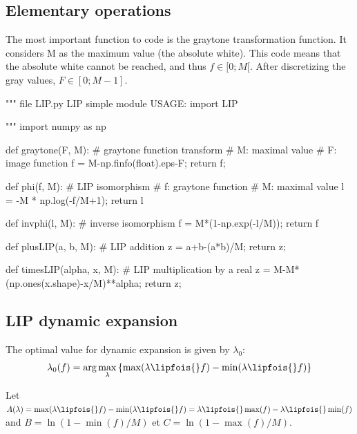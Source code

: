\def\QRCODE{MASTER_mispa_TUT.IMG.lip_pythonqrcode.png}
\def\QRPAGE{http://www.iptutorials.science/tree/master/MASTER_mispa/TUT.IMG.lip/python}

\subsection{Elementary operations}
The most important function to code is the graytone transformation function. It
considers M as the maximum value (the absolute white). This code means that
the absolute white cannot be reached, and thus $f\in[0; M[$. After discretizing the gray values, $F\in[0; M-1]$.

\begin{python}
"""
file LIP.py
LIP simple module
USAGE: import LIP

"""
import numpy as np

def graytone(F, M):
    # graytone function transform
    # M: maximal value
    # F: image function
    f = M-np.finfo(float).eps-F;
    return f;
\end{python}
\begin{python}    
def phi(f, M):
    # LIP isomorphism
    # f: graytone function
    # M: maximal value
    l = -M * np.log(-f/M+1);
    return l
\end{python}
\begin{python}    
def invphi(l, M):
    # inverse isomorphism
    f = M*(1-np.exp(-l/M));
    return f
\end{python}
\begin{python}
def plusLIP(a, b, M):
    # LIP addition
    z = a+b-(a*b)/M;
    return z;
\end{python}
\begin{python}
def timesLIP(alpha, x, M):
    # LIP multiplication by a real
    z = M-M*(np.ones(x.shape)-x/M)**alpha;
    return z;
\end{python}

\subsection{LIP dynamic expansion}
The optimal value for dynamic expansion is given by $\lambda_0$:
$$\lambda_0(f)=\arg\max_{\lambda}\left\{\max(\lambda\lipfois{} f)-\min(\lambda\lipfois{} f) \right\}$$

Let $A(\lambda)=\max(\lambda\lipfois{} f)-\min(\lambda\lipfois{} f)=\lambda\lipfois{}\max(f)-\lambda\lipfois{}\min(f)$ and $B=\ln(1-\min(f)/M)$ et $C=\ln(1-\max(f)/M)$.\vspace*{-1.2\baselineskip}


